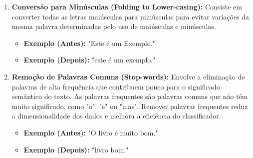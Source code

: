 \begin{enumerate}
    \item \textbf{Conversão para Minúsculas (Folding to Lower-casing):} Consiste em converter todas as letras maiúsculas para minúsculas para evitar variações da mesma palavra determinadas pelo uso de maiúsculas e minúsculas.
    \begin{itemize}
        \item \textbf{Exemplo (Antes):} "Este é um Exemplo."
        \item \textbf{Exemplo (Depois):} "este é um exemplo."
    \end{itemize}

    \item \textbf{Remoção de Palavras Comuns (Stop-words):} Envolve a eliminação de palavras de alta frequência que contribuem pouco para o significado semântico do texto.  As palavras frequentes são palavras comuns que não têm muito significado, como "o", "e" ou "mas". Remover palavras frequentes reduz a dimensionalidade dos dados e melhora a eficiência do classificador.
    \begin{itemize}
        \item \textbf{Exemplo (Antes):} "O livro é muito bom."
        \item \textbf{Exemplo (Depois):} "livro bom."
    \end{itemize}


\end{enumerate}
